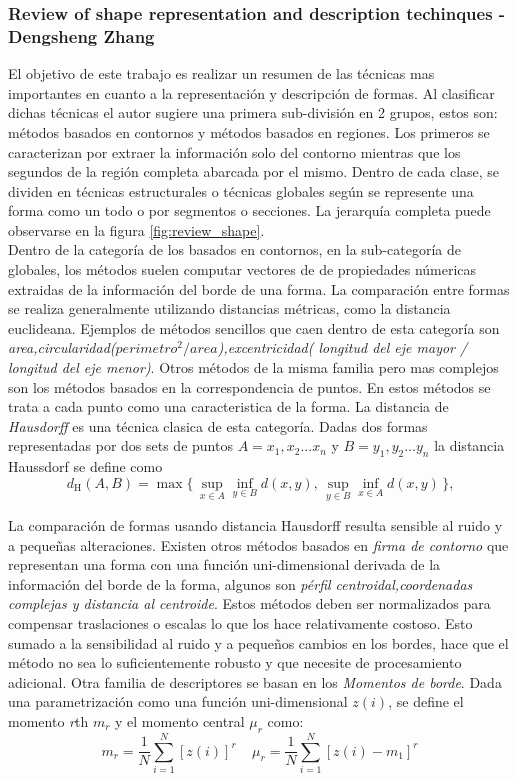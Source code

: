 	\subsubsection{Review of shape representation and description techinques - Dengsheng Zhang}
El objetivo de este trabajo es realizar un resumen de las técnicas mas importantes en cuanto a la representación y descripción de formas.
Al clasificar dichas técnicas el autor sugiere una primera sub-división en 2 grupos, estos son: métodos basados en contornos y métodos basados 
en regiones. Los primeros se caracterizan por extraer  la información solo del contorno mientras que los segundos de la región completa abarcada
por el mismo. Dentro de cada clase, se dividen en técnicas estructurales o técnicas globales según  se represente una forma como un todo o 
por segmentos o secciones. La jerarquía completa puede observarse en la figura \ref{fig:review_shape}.\\
\indent Dentro de la categoría de los basados en contornos, en la sub-categoría de globales, los métodos suelen computar vectores de 
de propiedades númericas extraidas de la información del borde de una forma. La comparación entre formas se realiza 
generalmente utilizando distancias métricas, como la distancia euclideana. Ejemplos de métodos sencillos que caen dentro de esta 
categoría son \textit{area,circularidad($perimetro^2 / area$),excentricidad( longitud del eje mayor / longitud del eje menor)}. Otros métodos 
de la misma familia pero mas complejos son los métodos basados en la correspondencia de puntos. En estos métodos se trata a cada punto como una 
caracteristica de la forma. La distancia de \textit{ Hausdorff} es una técnica clasica de esta categoría. Dadas dos formas representadas
por dos sets de puntos $A={x_1,x_2...x_n}$ y $B={y_1,y_2...y_n}$ la distancia Haussdorf se define como 
\[
	 d_{\mathrm H}(A,B) = \max\{\,\sup_{x \in A} \inf_{y \in B} d(x,y),\, \sup_{y \in B} \inf_{x \in A} d(x,y)\,\}\mbox{,}
\] 

La comparación de formas usando distancia Hausdorff resulta sensible al ruido y a pequeñas alteraciones. Existen otros métodos basados
en \textit{firma de contorno} que  representan una forma con una función uni-dimensional derivada de la información del borde de la forma, 
algunos son \textit{pérfil centroidal,coordenadas complejas y distancia al centroide}. Estos métodos deben ser normalizados para compensar
traslaciones o escalas lo que los hace relativamente costoso. Esto sumado a la sensibilidad al ruido y a pequeños cambios en los bordes, hace que el método 
no sea lo suficientemente robusto y que necesite de procesamiento adicional. Otra familia de descriptores se basan en los 
\textit{Momentos de borde}. Dada una parametrización como una función uni-dimensional $z(i)$, se define el momento \textit{r}th \textit{$m_r$} 
y el momento central $\mu_r$ como:
\[
	m_r=\frac{1}{N} \sum_{i=1}^{N}{[z(i)]^r}\ \ \ \ \
	\mu_r=\frac{1}{N} \sum_{i=1}^{N}{[z(i) - m_1]^r}
\]

